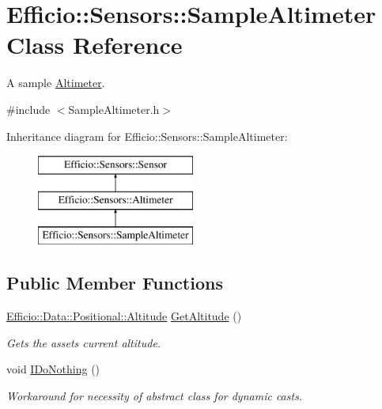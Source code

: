 \hypertarget{class_efficio_1_1_sensors_1_1_sample_altimeter}{}\section{Efficio\+:\+:Sensors\+:\+:Sample\+Altimeter Class Reference}
\label{class_efficio_1_1_sensors_1_1_sample_altimeter}


A sample \hyperlink{class_efficio_1_1_sensors_1_1_altimeter}{Altimeter}.  




{\ttfamily \#include $<$Sample\+Altimeter.\+h$>$}

Inheritance diagram for Efficio\+:\+:Sensors\+:\+:Sample\+Altimeter\+:\begin{figure}[H]
\begin{center}
\leavevmode
\includegraphics[height=3.000000cm]{class_efficio_1_1_sensors_1_1_sample_altimeter}
\end{center}
\end{figure}
\subsection*{Public Member Functions}
\begin{DoxyCompactItemize}
\item 
\hyperlink{class_efficio_1_1_data_1_1_positional_1_1_altitude}{Efficio\+::\+Data\+::\+Positional\+::\+Altitude} \hyperlink{class_efficio_1_1_sensors_1_1_sample_altimeter_a4240df76879249e32e4a2f0d47903d4d}{Get\+Altitude} ()\hypertarget{class_efficio_1_1_sensors_1_1_sample_altimeter_a4240df76879249e32e4a2f0d47903d4d}{}\label{class_efficio_1_1_sensors_1_1_sample_altimeter_a4240df76879249e32e4a2f0d47903d4d}

\begin{DoxyCompactList}\small\item\em Gets the asset\textquotesingle{}s current altitude. \end{DoxyCompactList}\item 
void \hyperlink{class_efficio_1_1_sensors_1_1_sample_altimeter_acae1463f94dba661e8151060804ff1d1}{I\+Do\+Nothing} ()\hypertarget{class_efficio_1_1_sensors_1_1_sample_altimeter_acae1463f94dba661e8151060804ff1d1}{}\label{class_efficio_1_1_sensors_1_1_sample_altimeter_acae1463f94dba661e8151060804ff1d1}

\begin{DoxyCompactList}\small\item\em Workaround for necessity of abstract class for dynamic casts. \end{DoxyCompactList}\end{DoxyCompactItemize}
